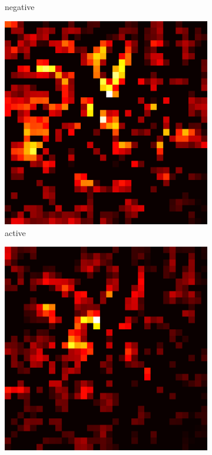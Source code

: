 \documentclass[preprint,12pt]{elsarticle}
\begin{document}
\begin{figure}
\begin{subfigure}{0.14\textwidth}
        \caption{negative}
    \end{subfigure}
    \hfill
    \begin{subfigure}{0.14\textwidth}
        \centering
        \includegraphics[width=\linewidth]{../visualizations/examples/cifar10/cnn/active_saliency_map/0.png}
        \caption{active}
    \end{subfigure}
    \hfill
    \begin{subfigure}{0.14\textwidth}
        \centering
        \includegraphics[width=\linewidth]{../visualizations/examples/cifar10/cnn/inactive_saliency_map/0.png}

\end{subfigure}
\end{figure}
\end{document}
